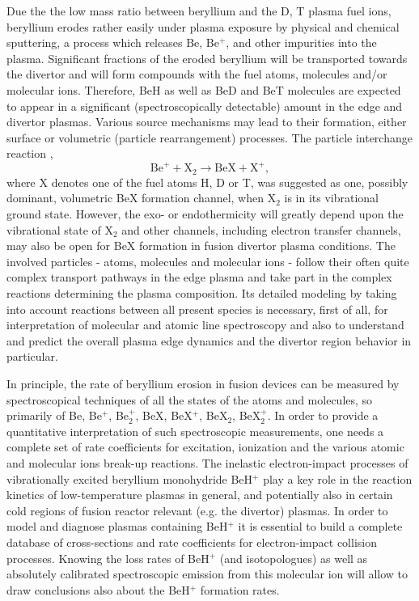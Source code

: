 \documentclass[reviewcopy]{elsarticle}
\begin{document}
Due the the low mass ratio between beryllium and the D, T plasma fuel ions, beryllium erodes rather easily under plasma exposure by physical and chemical sputtering, a process which releases Be, Be$^+$, and other impurities into the plasma. Significant fractions of the eroded beryllium will be transported towards the divertor and will form compounds with the fuel atoms, molecules and/or molecular ions. Therefore, BeH as well as BeD and BeT molecules are expected to appear in a significant (spectroscopically detectable) amount in the edge and divertor plasmas. Various source mechanisms may lead to their formation, either surface or volumetric (particle rearrangement) processes. The particle interchange reaction \cite{Nishijima2008},
\begin{equation}\label{eq1}
\mathrm{Be}^{+} + \mathrm{X}_{2} \longrightarrow \mathrm{BeX}+\mathrm{X}^{+}, 
\end{equation}
where X denotes one of the fuel atoms H, D or T, was suggested as one, possibly dominant, volumetric BeX formation channel, when X$_2$ is in its vibrational ground state. However, the exo- or endothermicity will greatly depend upon the vibrational state of X$_2$ and other channels, including electron transfer channels, may also be open for BeX formation in fusion divertor plasma conditions.
The involved particles - atoms, molecules and molecular ions - follow their often quite complex transport pathways in the edge plasma and take part in the complex reactions determining the plasma composition. Its detailed modeling by taking into account reactions between all present  species is necessary, first of all, for interpretation of molecular and atomic line spectroscopy and also to understand and predict the overall plasma edge dynamics and the divertor region behavior in particular.

In principle, the rate of beryllium erosion in fusion devices can be measured by spectroscopical techniques of all the states of the atoms and molecules, so primarily of Be, Be$^+$, Be$_2^+$, BeX, BeX$^+$, BeX$_2$, BeX$_2^+$. In order to provide a quantitative interpretation of such spectroscopic measurements, one needs a complete set of rate coefficients for excitation, ionization and the various atomic and molecular ions break-up reactions. The inelastic electron-impact processes of vibrationally excited beryllium monohydride BeH$^+$ play a key role in the reaction kinetics of low-temperature plasmas in general, and potentially also in certain cold regions of fusion reactor relevant (e.g. the divertor) plasmas. In order to model and diagnose plasmas containing BeH$^+$ it is essential to build a complete database of cross-sections and rate coefficients for electron-impact collision processes. Knowing the loss rates of BeH$^+$ 
(and isotopologues) as well as absolutely calibrated spectroscopic emission from this molecular ion will allow to draw conclusions also about the BeH$^+$ formation rates.
\end{document}
